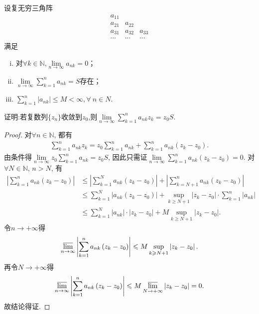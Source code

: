 \documentclass[../../main.tex]{subfiles}%
\begin{document}
\begin{theorem}[Toplitz定理]\label{theorem:复变版本-Toplitz定理}
设复无穷三角阵
\[
\begin{array}{ccc} 
a_{11} \\
a_{21} & a_{22} \\
a_{31} & a_{32} & a_{33} \\
\cdots & \cdots & \cdots
\end{array}
\]
满足
\begin{enumerate}[(i)]
\item 对$\forall k\in \mathbb{N}$,$\lim\limits_{n\rightarrow \infty}a_{nk}=0$；

\item $\lim\limits_{n\rightarrow \infty}\sum\limits_{k=1}^n a_{nk}=S$存在；

\item $\sum\limits_{k=1}^n |a_{nk}| \leqslant M < \infty,\forall\ n \in N$.
\end{enumerate}
证明:若复数列$\{z_n\}$收敛到$z_0$,则$\lim\limits_{n\rightarrow \infty}\sum\limits_{k=1}^n a_{nk}z_k=z_0S$.
\end{theorem}
\begin{proof}
对$\forall n\in \mathbb{N}$, 都有
\begin{align*}
\sum_{k=1}^n{a_{nk}z_k}=z_0\sum_{k=1}^n{a_{nk}}+\sum_{k=1}^n{a_{nk}\left( z_k-z_0 \right)}.
\end{align*}
由条件得$\lim\limits_{n\rightarrow \infty}z_0\sum_{k=1}^n{a_{nk}}=z_0S$, 因此只需证$\lim\limits_{n\rightarrow \infty}\sum_{k=1}^n{a_{nk}\left( z_k-z_0 \right)}=0$. 对$\forall N\in \mathbb{N}$, $n>N$, 有
\begin{align*}
\left| \sum_{k=1}^n{a_{nk}\left( z_k-z_0 \right)} \right|&\leqslant \left| \sum_{k=1}^N{a_{nk}\left( z_k-z_0 \right)} \right|+\left| \sum_{k=N+1}^n{a_{nk}\left( z_k-z_0 \right)} \right|
\\
&\leqslant \sum_{k=1}^N{\left| a_{nk}\left( z_k-z_0 \right) \right|}+\sup\limits_{k\geqslant N+1}\left| z_k-z_0 \right|\cdot \sum_{k=1}^n{\left| a_{nk} \right|}
\\
&\leqslant \sum_{k=1}^N{\left| a_{nk} \right|\cdot \left| z_k-z_0 \right|}+M\sup\limits_{k\geqslant N+1}\left| z_k-z_0 \right|.
\end{align*}
令$n\rightarrow +\infty$得
\begin{align*}
\varlimsup\limits_{n\rightarrow \infty}\left| \sum_{k=1}^n{a_{nk}\left( z_k-z_0 \right)} \right|\leqslant M\sup\limits_{k\geqslant N+1}\left| z_k-z_0 \right|.
\end{align*}
再令$N\rightarrow +\infty$得
\begin{align*}
\varlimsup\limits_{n\rightarrow \infty}\left| \sum_{k=1}^n{a_{nk}\left( z_k-z_0 \right)} \right|\leqslant M\varlimsup\limits_{N\rightarrow +\infty}\left| z_k-z_0 \right|=0.
\end{align*}
故结论得证.
\end{proof}
\end{document}
